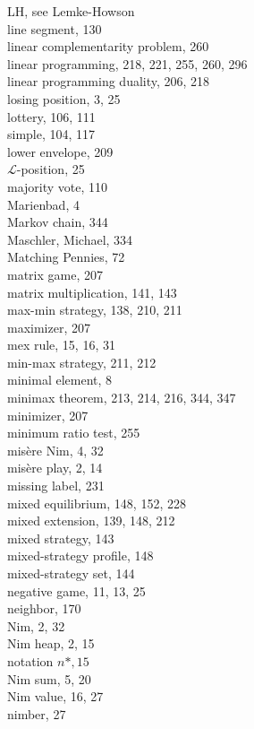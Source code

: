 \documentclass[12pt]{article}
\begin{document}
LH, see Lemke-Howson\\
line segment, 130\\
linear complementarity problem, 260\\
linear programming, 218, 221, 255, 260, 296\\
linear programming duality, 206, 218\\
losing position, 3, 25\\
lottery, 106, 111\\
simple, 104, 117\\
lower envelope, 209\\
$\mathcal{L}$-position, 25\\
majority vote, 110\\
Marienbad, 4\\
Markov chain, 344\\
Maschler, Michael, 334\\
Matching Pennies, 72\\
matrix game, 207\\
matrix multiplication, 141, 143\\
max-min strategy, 138, 210, 211\\
maximizer, 207\\
mex rule, 15, 16, 31\\
min-max strategy, 211, 212\\
minimal element, 8\\
minimax theorem, 213, 214, 216, 344, 347\\
minimizer, 207\\
minimum ratio test, 255\\
misère Nim, 4, 32\\
misère play, 2, 14\\
missing label, 231\\
mixed equilibrium, 148, 152, 228\\
mixed extension, 139, 148, 212\\
mixed strategy, 143\\
mixed-strategy profile, 148\\
mixed-strategy set, 144\\
negative game, 11, 13, 25\\
neighbor, 170\\
Nim, 2, 32\\
Nim heap, 2, 15\\
notation $n *, 15$\\
Nim sum, 5, 20\\
Nim value, 16, 27\\
nimber, 27\\
\end{document}
